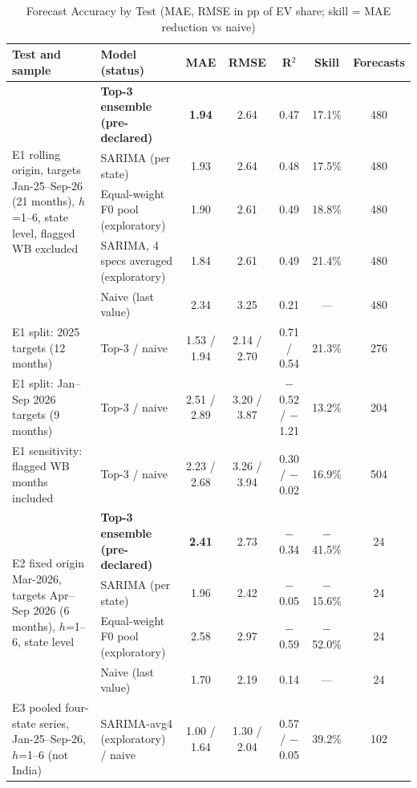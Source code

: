 \begin{table}[!t]
\caption{Forecast Accuracy by Test (MAE, RMSE in pp of EV share; skill = MAE reduction vs naive)}\label{tab:fc}
\centering\footnotesize
\begin{tabular}{p{4.6cm}p{4.0cm}ccccc}
\toprule
\textbf{Test and sample} & \textbf{Model (status)} & \textbf{MAE} & \textbf{RMSE} & \textbf{R$^2$} & \textbf{Skill} & \textbf{Forecasts}\\
\midrule
\multirow{5}{4.6cm}{E1 rolling origin, targets Jan-25--Sep-26 (21 months), $h$=1--6, state level, flagged WB excluded}
 & \textbf{Top-3 ensemble (pre-declared)} & \textbf{1.94} & 2.64 & 0.47 & 17.1\% & 480\\
 & SARIMA (per state) & 1.93 & 2.64 & 0.48 & 17.5\% & 480\\
 & Equal-weight F0 pool (exploratory) & 1.90 & 2.61 & 0.49 & 18.8\% & 480\\
 & SARIMA, 4 specs averaged (exploratory) & 1.84 & 2.61 & 0.49 & 21.4\% & 480\\
 & Naive (last value) & 2.34 & 3.25 & 0.21 & --- & 480\\
\midrule
E1 split: 2025 targets (12 months) & Top-3 / naive & 1.53 / 1.94 & 2.14 / 2.70 & 0.71 / 0.54 & 21.3\% & 276\\
E1 split: Jan--Sep 2026 targets (9 months) & Top-3 / naive & 2.51 / 2.89 & 3.20 / 3.87 & $-$0.52 / $-$1.21 & 13.2\% & 204\\
E1 sensitivity: flagged WB months included & Top-3 / naive & 2.23 / 2.68 & 3.26 / 3.94 & 0.30 / $-$0.02 & 16.9\% & 504\\
\midrule
\multirow{4}{4.6cm}{E2 fixed origin Mar-2026, targets Apr--Sep 2026 (6 months), $h$=1--6, state level}
 & \textbf{Top-3 ensemble (pre-declared)} & \textbf{2.41} & 2.73 & $-$0.34 & $-$41.5\% & 24\\
 & SARIMA (per state) & 1.96 & 2.42 & $-$0.05 & $-$15.6\% & 24\\
 & Equal-weight F0 pool (exploratory) & 2.58 & 2.97 & $-$0.59 & $-$52.0\% & 24\\
 & Naive (last value) & 1.70 & 2.19 & 0.14 & --- & 24\\
\midrule
E3 pooled four-state series, Jan-25--Sep-26, $h$=1--6 (not India) & SARIMA-avg4 (exploratory) / naive & 1.00 / 1.64 & 1.30 / 2.04 & 0.57 / $-$0.05 & 39.2\% & 102\\
\bottomrule
\end{tabular}
\end{table}

